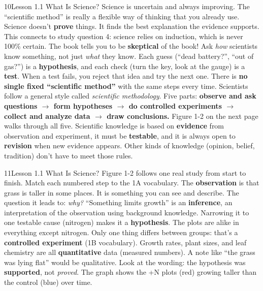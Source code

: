 \documentclass[11pt,letterpaper]{article}
\begin{document}
\begin{tbpage}{10}{Lesson 1.1 What Is Science?}
  {Science is uncertain and always improving. The ``scientific method'' is really a flexible way of thinking that you already use.}
    {Science doesn't \textbf{prove} things. It finds the best explanation the evidence supports. This connects to study question 4: science relies on induction, which is never 100\% certain.}
    {The book tells you to be \textbf{skeptical} of the book! Ask \emph{how} scientists know something, not just \emph{what} they know.}
    {Each guess (``dead battery?'', ``out of gas?'') is a \textbf{hypothesis}, and each check (turn the key, look at the gauge) is a \textbf{test}. When a test fails, you reject that idea and try the next one.}
    {There is \textbf{no single fixed ``scientific method''} with the same steps every time. Scientists follow a general style called \emph{scientific methodology}.}
    {Five parts: \textbf{observe and ask questions $\rightarrow$ form hypotheses $\rightarrow$ do controlled experiments $\rightarrow$ collect and analyze data $\rightarrow$ draw conclusions.} Figure 1-2 on the next page walks through all five.}
    {Scientific knowledge is based on \textbf{evidence} from observation and experiment, it must be \textbf{testable}, and it is always open to \textbf{revision} when new evidence appears. Other kinds of knowledge (opinion, belief, tradition) don't have to meet those rules.}
\end{tbpage}

\begin{tbpage}{11}{Lesson 1.1 What Is Science?}
  {Figure 1-2 follows one real study from start to finish. Match each numbered step to the 1A vocabulary.}
    {The \textbf{observation} is that grass is taller in some places. It is something you can see and describe. The question it leads to: \emph{why?}}
    {``Something limits growth'' is an \textbf{inference}, an interpretation of the observation using background knowledge. Narrowing it to one testable cause (nitrogen) makes it a \textbf{hypothesis}.}
    {The plots are alike in everything except nitrogen. Only one thing differs between groups: that's a \textbf{controlled experiment} (1B vocabulary).}
    {Growth rates, plant sizes, and leaf chemistry are all \textbf{quantitative} data (measured numbers). A note like ``the grass was lying flat'' would be qualitative.}
    {Look at the wording: the hypothesis was \textbf{supported}, not \emph{proved}. The graph shows the +N plots (red) growing taller than the control (blue) over time.}
\end{tbpage}
\end{document}
